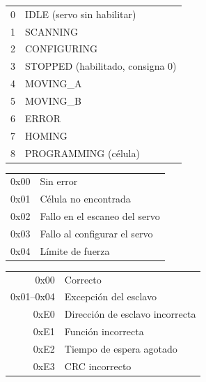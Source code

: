 \begin{table}[H]
\centering
\begin{minipage}[t]{0.47\textwidth}
\centering
{}\label{tab:estados}
\begin{tabular}{@{}rl@{}}
\toprule
0 & IDLE (servo sin habilitar) \\
1 & SCANNING \\
2 & CONFIGURING \\
3 & STOPPED (habilitado, consigna 0) \\
4 & MOVING\_A \\
5 & MOVING\_B \\
6 & ERROR \\
7 & HOMING \\
8 & PROGRAMMING (célula) \\
\bottomrule
\end{tabular}
\end{minipage}\hfill
\begin{minipage}[t]{0.47\textwidth}
\centering
{}\label{tab:errores}
\begin{tabular}{@{}rl@{}}
\toprule
0x00 & Sin error \\
0x01 & Célula no encontrada \\
0x02 & Fallo en el escaneo del servo \\
0x03 & Fallo al configurar el servo \\
0x04 & Límite de fuerza \\
\bottomrule
\end{tabular}

\vspace{4mm}
\label{tab:mbstatus}
\begin{tabular}{@{}rl@{}}
\toprule
0x00 & Correcto \\
0x01--0x04 & Excepción del esclavo \\
0xE0 & Dirección de esclavo incorrecta \\
0xE1 & Función incorrecta \\
0xE2 & Tiempo de espera agotado \\
0xE3 & CRC incorrecto \\
\bottomrule
\end{tabular}
\end{minipage}
\end{table}

